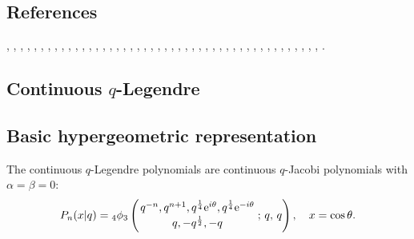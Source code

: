\documentclass[envcountchap,graybox]{svmono}
\newcommand{\qhyp}[5]{\mbox{}_{#1}{\phi}_{#2}
\left(\genfrac{}{}{0pt}{}{#3}{#4}\,;\,q,\,#5\right)}
\newcommand{\e}{\textrm{e}}
\newcommand{\qhyp}[5]{\,\mbox{}_{#1}\phi_{#2}\!\left(
  \genfrac{}{}{0pt}{}{#3}{#4};#5\right)}
\begin{document}
\subsection*{References}
\cite{AlSalamAllaway84I}, \cite{AlSalamAllaway84II}, \cite{AlSalam90}, \cite{AndrewsAskey85},
\cite{Askey89I}, \cite{Askey89II}, \cite{Askey89III}, \cite{AskeyIsmail80},
\cite{AskeyIsmail83}, \cite{AskeyIsmail84}, \cite{AskeyKoornRahman}, \cite{AskeyWilson85},
\cite{AtakRahmanSuslov}, \cite{Bressoud81}, \cite{BustozIsmail82}, \cite{BustozIsmail83},
\cite{FloreaniniVinetI}, \cite{Gasper81}, \cite{Gasper85}, \cite{Gasper89},
\cite{GasperRahman83II}, \cite{GasperRahman86}, \cite{GasperRahman89}, \cite{GasperRahman90},
\cite{Ismail86I}, \cite{IsmailMassonSuslov}, \cite{IsmailStanton88}, \cite{IsmailStanton97},
\cite{IsmailZhang}, \cite{Koelink95II}, \cite{Koelink96I}, \cite{Koorn90I}, \cite{Koorn2005},
\cite{Koorn2007}, \cite{Liu}, \cite{NassrallahRahman}, \cite{Nikiforov+}, \cite{NoumiMimachi91},
\cite{Rahman88}, \cite{Rahman92}, \cite{RahmanVerma86I}, \cite{RahmanVerma86II},
\cite{RahmanVerma87}, \cite{Rogers93}, \cite{Rogers94}, \cite{Rogers95}, \cite{Spiridonov96}.


\subsection{Continuous $q$-Legendre}
\par

\subsection*{Basic hypergeometric representation} The continuous $q$-Legendre polynomials are continuous
$q$-Jacobi polynomials with $\alpha=\beta=0$:
\begin{equation}
\label{DefContqLegendre}
P_n(x|q)=\qhyp{4}{3}{q^{-n},q^{n+1},q^{\frac{1}{4}}\e^{i\theta},
q^{\frac{1}{4}}\e^{-i\theta}}{q,-q^{\frac{1}{2}},-q}{q},\quad x=\cos\theta.
\end{equation}
\end{document}

